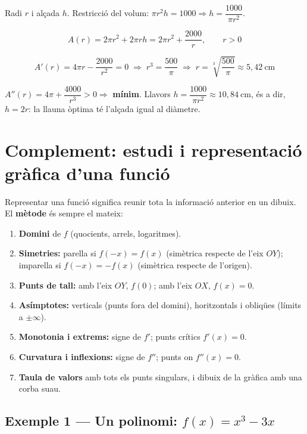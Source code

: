 Radi $r$ i alçada $h$. Restricció del volum: $\pi r^2 h = 1000 \Rightarrow h = \dfrac{1000}{\pi r^2}$.

\begin{equation*}
A(r) = 2\pi r^2 + 2\pi r h = 2\pi r^2 + \frac{2000}{r}, \qquad r > 0
\end{equation*}

\begin{equation*}
A'(r) = 4\pi r - \frac{2000}{r^2} = 0 \;\Rightarrow\; r^3 = \frac{500}{\pi} \;\Rightarrow\; r = \sqrt[3]{\frac{500}{\pi}} \approx 5{,}42\ \text{cm}
\end{equation*}

$A''(r) = 4\pi + \dfrac{4000}{r^3} > 0 \Rightarrow$ \textbf{mínim}. Llavors $h = \dfrac{1000}{\pi r^2} \approx 10{,}84\ \text{cm}$, és a dir, $h = 2r$: la llauna òptima té l'alçada igual al diàmetre.

\section{Complement: estudi i representació gràfica d'una funció}

Representar una funció significa reunir tota la informació anterior en un dibuix. El \textbf{mètode} és sempre el mateix:

\begin{enumerate}
\item \textbf{Domini} de $f$ (quocients, arrels, logaritmes).
\item \textbf{Simetries:} parella si $f(-x)=f(x)$ (simètrica respecte de l'eix $OY$); imparella si $f(-x)=-f(x)$ (simètrica respecte de l'origen).
\item \textbf{Punts de tall:} amb l'eix $OY$, $f(0)$; amb l'eix $OX$, $f(x)=0$.
\item \textbf{Asímptotes:} verticals (punts fora del domini), horitzontals i obliqües (límits a $\pm\infty$).
\item \textbf{Monotonia i extrems:} signe de $f'$; punts crítics $f'(x)=0$.
\item \textbf{Curvatura i inflexions:} signe de $f''$; punts on $f''(x)=0$.
\item \textbf{Taula de valors} amb tots els punts singulars, i dibuix de la gràfica amb una corba suau.
\end{enumerate}

\subsection{Exemple 1 --- Un polinomi: $f(x)=x^3-3x$}

